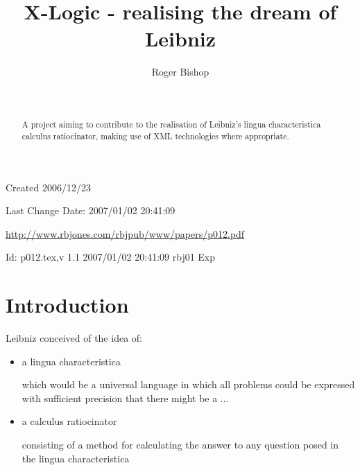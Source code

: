 \documentclass[numreferences]{rbjk}
\begin{document}
                                                                                   
\begin{article}
\begin{opening}  
\title{X-Logic - realising the dream of Leibniz}
\author{Roger Bishop }
\date{$ $\ $ $}

\begin{abstract}
A project aiming to contribute to the realisation of Leibniz's lingua characteristica calculus ratiocinator, making use of XML technologies where appropriate.
\end{abstract}

\end{opening}

\vfill

\begin{centering}
\footnotesize{
Created 2006/12/23

Last Change $ $Date: 2007/01/02 20:41:09 $ $

\href{http://www.rbjones.com/rbjpub/www/papers/p012.pdf}{http://www.rbjones.com/rbjpub/www/papers/p012.pdf}

$ $Id: p012.tex,v 1.1 2007/01/02 20:41:09 rbj01 Exp $ $\\

}%
\end{centering}

\newpage
\setcounter{tocdepth}{4}
{\parskip-0pt\tableofcontents}

\section{Introduction}

Leibniz conceived of the idea of:

\begin{itemize}
\item a lingua characteristica

which would be a universal language in which all problems could be expressed with sufficient precision that there might be a ...

\item a calculus ratiocinator

consisting of a method for calculating the answer to any question posed in the lingua characteristica

\end{itemize}


\end{article}
\end{document}
